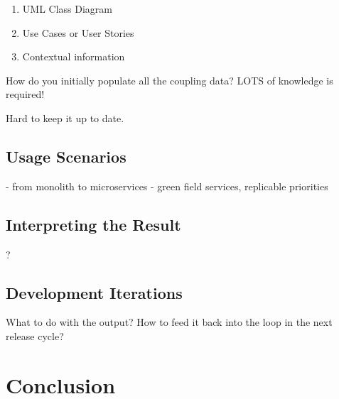 \begin{enumerate}
\item UML Class Diagram
\item Use Cases or User Stories
\item Contextual information
\end{enumerate}


How do you initially populate all the coupling data? LOTS of knowledge is required!

Hard to keep it up to date.


\subsection{Usage Scenarios}


- from monolith to microservices
- green field services, replicable priorities

\subsection{Interpreting the Result}

?

\subsection{Development Iterations}

What to do with the output? How to feed it back into the loop in the next release cycle?

\section{Conclusion}

